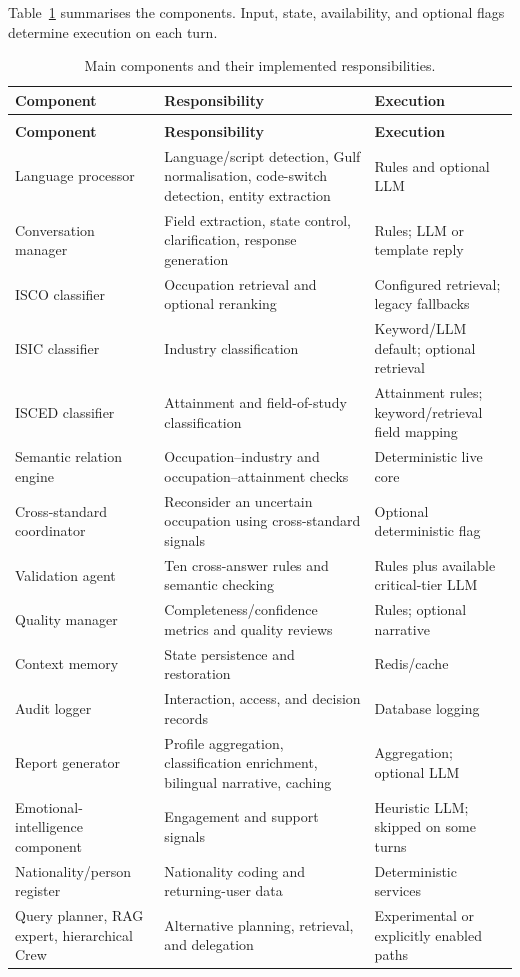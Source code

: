 Table~\ref{tab:ch3-agents} summarises the components. Input, state,
availability, and optional flags determine execution on each turn.

\begingroup
\small
\setlength{\tabcolsep}{4pt}
\begin{longtable}{>{\raggedright\arraybackslash}p{3.2cm}
                  >{\raggedright\arraybackslash}p{6.9cm}
                  >{\raggedright\arraybackslash}p{3.4cm}}
\caption{Main components and their implemented responsibilities.}
\label{tab:ch3-agents}\\
\toprule
\textbf{Component} & \textbf{Responsibility} & \textbf{Execution}\\
\midrule
\endfirsthead
\multicolumn{3}{c}{\tablename\ \thetable{} --- continued}\\
\toprule
\textbf{Component} & \textbf{Responsibility} & \textbf{Execution}\\
\midrule
\endhead
\bottomrule
\endlastfoot
Language processor & Language/script detection, Gulf normalisation,
code-switch detection, entity extraction & Rules and optional LLM\\
Conversation manager & Field extraction, state control, clarification,
response generation & Rules; LLM or template reply\\
ISCO classifier & Occupation retrieval and optional reranking &
Configured retrieval; legacy fallbacks\\
ISIC classifier & Industry classification & Keyword/LLM default;
optional retrieval\\
ISCED classifier & Attainment and field-of-study classification &
Attainment rules; keyword/retrieval field mapping\\
Semantic relation engine & Occupation--industry and
occupation--attainment checks & Deterministic live core\\
Cross-standard coordinator & Reconsider an uncertain occupation using
cross-standard signals & Optional deterministic flag\\
Validation agent & Ten cross-answer rules and semantic checking &
Rules plus available critical-tier LLM\\
Quality manager & Completeness/confidence metrics and quality reviews &
Rules; optional narrative\\
Context memory & State persistence and restoration & Redis/cache\\
Audit logger & Interaction, access, and decision records &
Database logging\\
Report generator & Profile aggregation, classification enrichment,
bilingual narrative, caching & Aggregation; optional LLM\\
Emotional-intelligence component & Engagement and support signals &
Heuristic LLM; skipped on some turns\\
Nationality/person register & Nationality coding and returning-user
data & Deterministic services\\
Query planner, RAG expert, hierarchical Crew & Alternative planning,
retrieval, and delegation & Experimental or explicitly enabled paths\\
\end{longtable}
\endgroup

